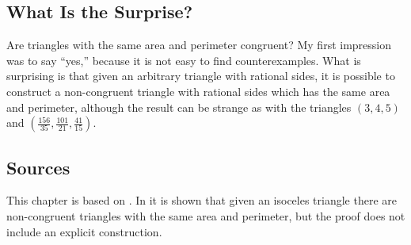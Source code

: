 \vspace{-4ex}

\subsection*{What Is the Surprise?}

Are triangles with the same area and perimeter congruent? My first impression was to say ``yes,'' because it is not easy to find counterexamples. What is surprising is that given an arbitrary triangle with rational sides, it is possible to construct a non-congruent triangle with rational sides which has the same area and perimeter, although the result can be strange as with the triangles $(3,4,5)$ and $\left(\frac{156}{35}, \frac{101}{21}, \frac{41}{15}\right)$.

\vspace{-2ex}

\subsection*{Sources}

This chapter is based on \cite{mccallum}. In \cite{marita} it is shown that given an isoceles triangle there are non-congruent triangles with the same area and perimeter, but the proof does not include an explicit construction.

